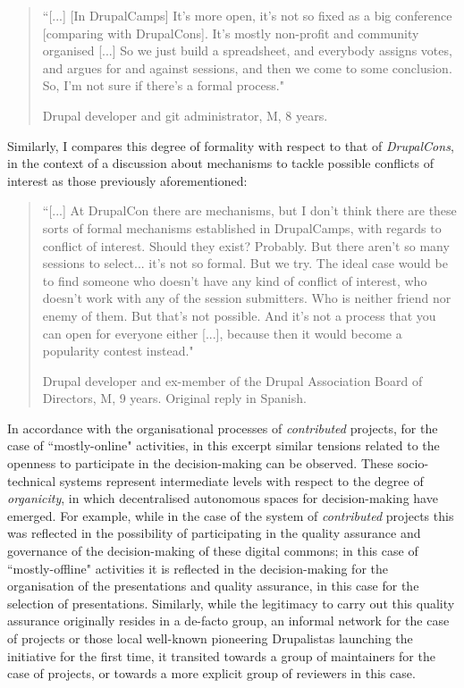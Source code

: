 \begin{quotation}
``[...] [In DrupalCamps] It's more open, it's not so fixed as a big conference [comparing with DrupalCons]. It's mostly non-profit and community organised [...] So we just build a spreadsheet, and everybody assigns votes, and argues for and against sessions, and then we come to some conclusion. So, I'm not sure if there's a formal process."

\begin{flushright}\footnotesize{Drupal developer and git administrator, M, 8 years.}\end{flushright}
\end{quotation}

Similarly, I compares this degree of formality with respect to that of \textit{DrupalCons}, in the context of a discussion about mechanisms to tackle possible conflicts of interest as those previously aforementioned:

\begin{quotation}
``[...] At DrupalCon there are mechanisms, but I don't think there are these sorts of formal mechanisms established in DrupalCamps, with regards to conflict of interest. Should they exist? Probably. But there aren't so many sessions to select... it's not so formal. But we try. The ideal case would be to find someone who doesn't have any kind of conflict of interest, who doesn't work with any of the session submitters. Who is neither friend nor enemy of them. But that's not possible. And it's not a process that you can open for everyone either [...], because then it would become a popularity contest instead."

\begin{flushright}\footnotesize{Drupal developer and ex-member of the Drupal Association Board of Directors, M, 9 years. Original reply in Spanish.}\end{flushright}
\end{quotation}

In accordance with the organisational processes of \textit{contributed} projects, for the case of ``mostly-online" activities, in this excerpt similar tensions related to the openness to participate in the decision-making can be observed. These socio-technical systems represent intermediate levels with respect to the degree of \textit{organicity}, in which decentralised autonomous spaces for decision-making have emerged. For example, while in the case of the system of \textit{contributed} projects this was reflected in the possibility of participating in the quality assurance and governance of the decision-making of these digital commons; in this case of ``mostly-offline" activities it is reflected in the decision-making for the organisation of the presentations and quality assurance, in this case for the selection of presentations. Similarly, while the legitimacy to carry out this quality assurance originally resides in a de-facto group, an informal network for the case of projects or those local well-known pioneering Drupalistas launching the initiative for the first time, it transited towards a group of maintainers for the case of projects, or towards a more explicit group of reviewers in this case.

